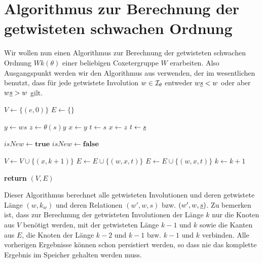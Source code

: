 \section{Algorithmus zur Berechnung der getwisteten schwachen Ordnung}

Wir wollen nun einen Algorithmus zur Berechnung der getwisteten schwachen
Ordnung $Wk(\theta)$ einer beliebigen Coxetergruppe $W$ erarbeiten. Also
Ausgangspunkt werden wir den Algorithmus aus \cite[Algorithm 3.1.1]{haas:twoa}
verwenden, der im wesentlichen benutzt, dass für jede getwistete Involution $w
\in \mathcal{I}_{\theta}$ entweder $w \underline{s} < w$ oder aber $w \underline{s} > w$ gilt.

\begin{algo}[Algorithmus 1]
\hfill
\label{algo:twoa1}
\begin{algorithmic}[1]
 
\State $V \gets \{(e,0)\}$
\State $E \gets \{\}$

		  \State $y \gets ws$
			\State $z \gets \theta(s)y$
				\State $x \gets y$ 
				\State $t \gets s$
			\Else
				\State $x \gets z$ 
				\State $t \gets \underline{s}$
			\EndIf
			
			\State $isNew \gets \textbf{true}$
			 
					\State $isNew \gets \textbf{false}$
				\EndIf
			\EndFor
			
				\State $V \gets V \cup \{ (x,k+1) \}$
				\State $E \gets E \cup \{ (w,x,t) \}$
			\Else
				\State $E \gets E \cup \{ (w,x,t) \}$
			\EndIf
		\EndFor
	\EndFor
	\State $k \gets k + 1$
\EndFor

\State \textbf{return} $(V,E)$
\EndProcedure
\end{algorithmic}
\end{algo}

Dieser Algorithmus berechnet alle getwisteten Involutionen und deren getwistete
Länge $(w,k_w)$ und deren Relationen $(w',w,s)$ bzw. $(w',w,\underline{s})$. Zu bemerken
ist, dass zur Berechnung der getwisteten Involutionen der Länge $k$ nur die
Knoten aus $V$ benötigt werden, mit der getwisteten Länge $k-1$ und $k$ sowie
die Kanten aus $E$, die Knoten der Länge $k-2$ und $k-1$ bzw. $k-1$ und $k$
verbinden. Alle vorherigen Ergebnisse können schon persistiert werden, so dass
nie das komplette Ergebnis im Speicher gehalten werden muss.

